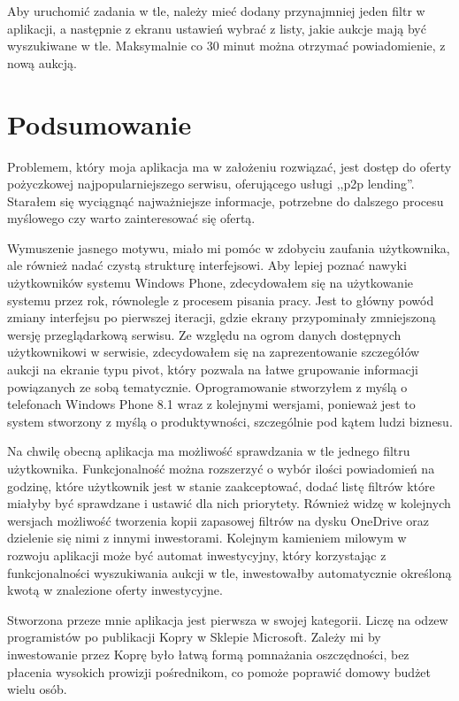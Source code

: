 \documentclass[a4paper,twoside,titlepage,openright]{book}
\begin{document}
Aby uruchomić zadania w tle, należy mieć dodany przynajmniej jeden filtr w aplikacji, a następnie z ekranu ustawień wybrać z listy, jakie aukcje mają być wyszukiwane w tle. Maksymalnie co 30 minut można otrzymać powiadomienie, z nową aukcją.
 
 

 
\clearpage{\pagestyle{empty}\cleardoublepage}
\chapter{Podsumowanie}
Problemem, który moja aplikacja ma w założeniu rozwiązać, jest dostęp do oferty pożyczkowej najpopularniejszego serwisu, oferującego usługi ,,p2p lending''. Starałem się wyciągnąć najważniejsze informacje, potrzebne do dalszego procesu myślowego czy warto zainteresować się ofertą. 

Wymuszenie jasnego motywu, miało mi pomóc w zdobyciu zaufania użytkownika, ale również nadać czystą strukturę interfejsowi. Aby lepiej poznać nawyki użytkowników systemu Windows Phone, zdecydowałem się na użytkowanie systemu przez rok, równolegle z procesem pisania pracy. Jest to główny powód zmiany interfejsu po pierwszej iteracji, gdzie ekrany przypominały zmniejszoną wersję przeglądarkową serwisu. Ze względu na ogrom danych dostępnych użytkownikowi w serwisie, zdecydowałem się na zaprezentowanie szczegółów aukcji na ekranie typu pivot, który pozwala na łatwe grupowanie informacji powiązanych ze sobą tematycznie. 
Oprogramowanie stworzyłem z myślą o telefonach Windows Phone 8.1 wraz z kolejnymi wersjami, ponieważ jest to system stworzony z myślą o produktywności, szczególnie pod kątem ludzi biznesu. 

Na chwilę obecną aplikacja ma możliwość sprawdzania w tle jednego filtru użytkownika. Funkcjonalność można rozszerzyć o wybór ilości powiadomień na godzinę, które użytkownik jest w stanie zaakceptować, dodać listę filtrów które miałyby być sprawdzane i ustawić dla nich priorytety. Również widzę w kolejnych wersjach możliwość tworzenia kopii zapasowej filtrów na dysku OneDrive oraz dzielenie się nimi z innymi inwestorami. Kolejnym kamieniem milowym w rozwoju aplikacji może być automat inwestycyjny, który korzystając z funkcjonalności wyszukiwania aukcji w tle, inwestowałby automatycznie określoną kwotą w znalezione oferty inwestycyjne.

Stworzona przeze mnie aplikacja jest pierwsza w swojej kategorii. Liczę na odzew programistów po publikacji Kopry w Sklepie Microsoft. Zależy mi by inwestowanie przez Koprę było łatwą formą pomnażania oszczędności, bez płacenia wysokich prowizji pośrednikom, co pomoże poprawić domowy budżet wielu osób.
 
\end{document}
